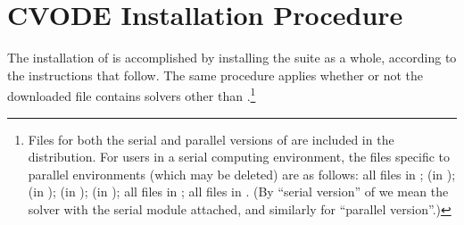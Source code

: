 \chapter{CVODE Installation Procedure}\label{c:install}

The installation of {\cvode} is accomplished by installing the
{\sundials} suite as a whole, according to the instructions that
follow. The same procedure applies whether or not the downloaded
file contains solvers other than {\cvode}.\footnote{Files for both the
serial and parallel versions of {\cvode} are included in the distribution.
For users in a serial computing environment, the files specific to parallel
environments (which may be deleted) are as follows:
all files in ;
 (in );
 (in );
 (in ); 
 (in );
all files in ;
all files in .
(By ``serial version'' of {\cvode} we mean the {\cvode} solver with the
serial {\nvector} module attached, and similarly for ``parallel version''.)}




